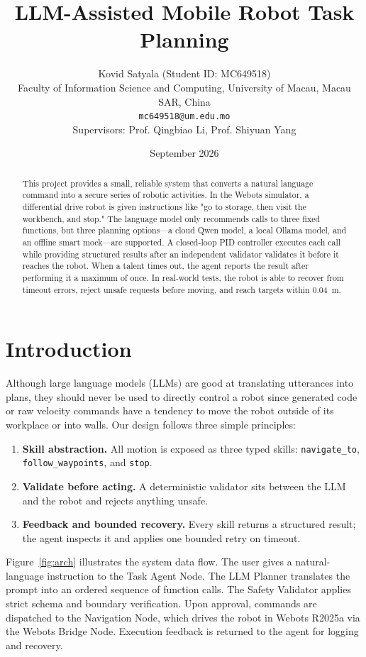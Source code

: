 \documentclass[11pt]{article}
\title{\textbf{LLM-Assisted Mobile Robot Task Planning}}
\author{Kovid Satyala (Student ID: MC649518)\\
Faculty of Information Science and Computing, University of Macau, Macau SAR, China\\
\texttt{mc649518@um.edu.mo}\\[2pt]
\small Supervisors: Prof. Qingbiao Li, Prof. Shiyuan Yang}
\date{September 2026}
\begin{document}
\maketitle

\begin{abstract}
This project provides a small, reliable system that converts a natural language command into a secure series of robotic activities. In the Webots simulator, a differential drive robot is given instructions like "go to storage, then visit the workbench, and stop." The language model only recommends calls to three fixed functions, but three planning options—a cloud Qwen model, a local Ollama model, and an offline smart mock—are supported. A closed-loop PID controller executes each call while providing structured results after an independent validator validates it before it reaches the robot. When a talent times out, the agent reports the result after performing it a maximum of once. In real-world tests, the robot is able to recover from timeout errors, reject unsafe requests before moving, and reach targets within 0.04~m.
\end{abstract}

\section{Introduction}
Although large language models (LLMs) are good at translating utterances into plans, they should never be used to directly control a robot since generated code or raw velocity commands have a tendency to move the robot outside of its workplace or into walls. Our design follows three
simple principles:

\begin{enumerate}
  \item \textbf{Skill abstraction.} All motion is exposed as three typed
  skills: \texttt{navigate\_to}, \texttt{follow\_waypoints}, and \texttt{stop}.
  \item \textbf{Validate before acting.} A deterministic validator sits between
  the LLM and the robot and rejects anything unsafe.
  \item \textbf{Feedback and bounded recovery.} Every skill returns a
  structured result; the agent inspects it and applies one bounded retry on
  timeout.
\end{enumerate}

Figure~\ref{fig:arch} illustrates the system data flow. The user gives a
natural-language instruction to the Task Agent Node. The LLM Planner translates
the prompt into an ordered sequence of function calls. The Safety Validator
applies strict schema and boundary verification. Upon approval, commands are
dispatched to the Navigation Node, which drives the robot in Webots R2025a via
the Webots Bridge Node. Execution feedback is returned to the agent for logging
and recovery.
\end{document}

